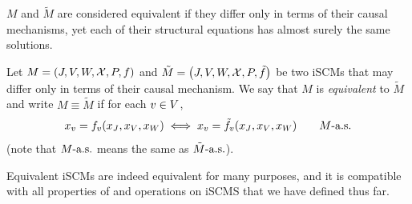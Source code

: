 $M$ and $\tilde{M}$ are considered equivalent if they differ only in terms of their causal mechanisms, yet each of their structural equations has almost surely the same solutions.
\begin{Def}\label{def:equivalent_scms}
  Let $M = \left ( J, V, W, \mathcal{X}, P, f \right )$ and
  $\tilde{M} = \left ( J, V, W, \mathcal{X}, P, \tilde{f} \right )$ be two iSCMs that may differ only in terms of their causal mechanism. 
  We say that $M$ is \emph{equivalent} to $\tilde{M}$ and write $M \equiv \tilde{M}$ if for each $v \in V$,
  $$x_v = f_v(x_{J},x_{V},x_{W}) \iff x_v = \tilde{f}_v(x_{J},x_{V},x_{W}) \qquad M\text{-a.s.}$$
  (note that $M\text{-a.s.}$ means the same as $\tilde{M}\text{-a.s.}$).
\end{Def}
Equivalent iSCMs are indeed equivalent for many purposes, and it is compatible with all properties of and operations on iSCMS that we have defined thus far.
